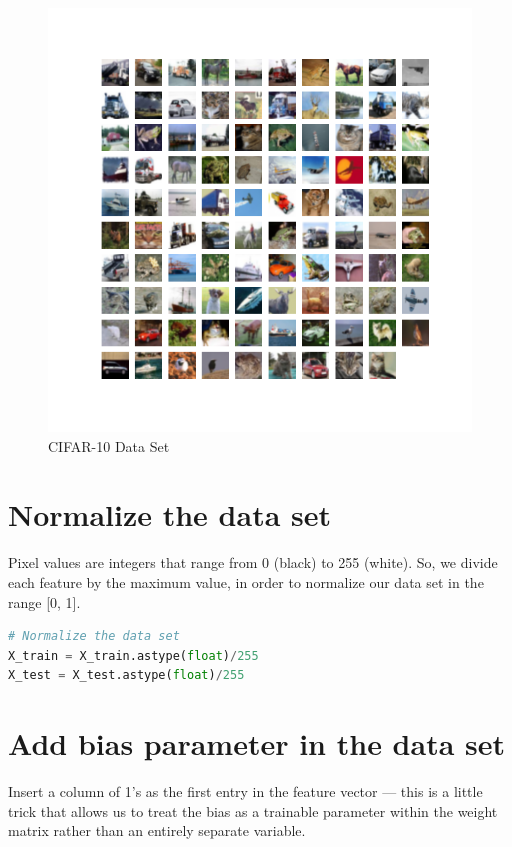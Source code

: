 \documentclass[11pt]{article}
\begin{document}
\begin{figure}[ht!]
  \includegraphics[width=\linewidth]{./Project_1_files/cifar_data.png}
  \caption{CIFAR-10 Data Set}
  \label{fig:cifar}
\end{figure}

\hfill

\newpage

\section{Normalize the data set }
Pixel values are integers that range from 0 (black) to 255 (white). So, we divide each feature by the maximum value, in order to normalize our data set in the range [0, 1]. \\

\begin{lstlisting}[language = Python]
# Normalize the data set
X_train = X_train.astype(float)/255
X_test = X_test.astype(float)/255
\end{lstlisting}
\hfill


\section{Add bias parameter in the data set}
Insert a column of 1's as the first entry in the feature vector --- this is a little trick that allows us to treat
the bias as a trainable parameter within the weight matrix rather than an entirely separate variable. \\
\end{document}

